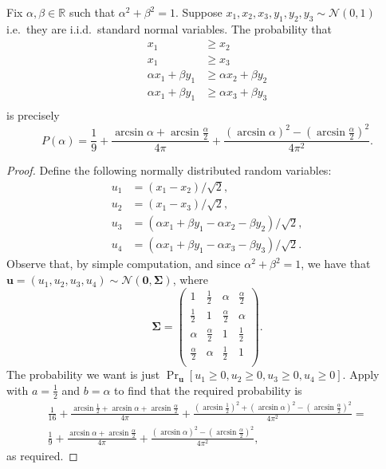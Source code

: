 \documentclass[a4paper,11pt, DIV=11]{scrartcl}
\theoremstyle{plain}
\theoremstyle{definition}
\begin{document}
\begin{lemma}\label{lem:prExpr}
Fix $\alpha, \beta \in \mathbb{R}$ such that $\alpha^2 + \beta^2 = 1$. Suppose $x_1, x_2, x_3, y_1, y_2, y_3 \sim \mathcal{N}(0, 1)$ i.e.~they are i.i.d.~standard normal variables. The probability that
\begin{align*}
x_1 & \geq x_2 \\
x_1 & \geq x_3 \\
\alpha x_1 + \beta y_1 & \geq  \alpha x_2 + \beta y_2 \\
\alpha x_1 + \beta y_1 & \geq  \alpha x_3 + \beta y_3 \\
\end{align*}
is precisely
\[
P(\alpha) = 
\frac{1}{9}
+ \frac{\arcsin \alpha + \arcsin \frac{\alpha}{2}}{4\pi} 
+ \frac{
{(\arcsin \alpha)}^2-
{(\arcsin \frac{\alpha}{2})}^2
}{4\pi^2}.
\]
\end{lemma}
\begin{proof}
Define the following normally distributed random variables:
\begin{align*}
u_1 &= (x_1 - x_2)/\sqrt{2}, \\
u_2 &= (x_1 - x_3)/\sqrt{2}, \\
u_3 &= (\alpha x_1 + \beta y_1 - \alpha x_2 - \beta y_2)/\sqrt{2}, \\
u_4 &= (\alpha x_1 + \beta y_1 - \alpha x_3 - \beta y_3)/\sqrt{2}.
\end{align*}
Observe that, by simple computation, and since $\alpha^2 + \beta^2 = 1$, we have that $\mathbf{u} = (u_1, u_2, u_3, u_4) \sim \mathcal{N}(\mathbf{0}, \mathbf{\Sigma})$, where
\[
\mathbf{\Sigma} = \begin{pmatrix}
1 & \frac{1}{2} & \alpha & \frac{\alpha}{2} \\
\frac{1}{2} & 1 & \frac{\alpha}{2}& \alpha \\
 \alpha & \frac{\alpha}{2} & 1 & \frac{1}{2} \\
\frac{\alpha}{2}& \alpha & \frac{1}{2} & 1 \\
\end{pmatrix}.
\]
The probability we want is just $\Pr_{\mathbf{u}}[ u_1 \geq 0, u_2 \geq 0, u_3 \geq 0, u_4 \geq 0]$. Apply~ with $a = \frac{1}{2}$ and $b = \alpha$ to find that the required probability is
\begin{multline*}
\frac{1}{16} + \frac{\arcsin \frac{1}{2} + \arcsin \alpha + \arcsin \frac{\alpha}{2}}{4\pi} + \frac{{(\arcsin \frac{1}{2})}^2 + {(\arcsin \alpha)}^2 - {(\arcsin \frac{\alpha}{2})}^2}{4\pi^2} = \\
\frac{1}{9}
+ \frac{\arcsin \alpha + \arcsin \frac{\alpha}{2}}{4\pi} 
+ \frac{{(\arcsin \alpha)}^2-{(\arcsin \frac{\alpha}{2})}^2}{4\pi^2},
\end{multline*}
as required.
\end{proof}
\end{document}
